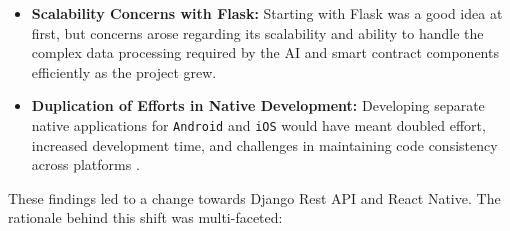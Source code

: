 \begin{itemize}
    \item \textbf{Scalability Concerns with Flask:} Starting with Flask was a good idea at first, but  concerns arose regarding its scalability and ability to handle the complex data processing \cite{Ghimire2020, CopperwaiteEtAl2015} required by the AI and smart contract components efficiently as the project grew.
    \item \textbf{Duplication of Efforts in Native Development:} Developing separate native applications for \texttt{Android} and \texttt{iOS} would have meant doubled effort, increased development time, and challenges in maintaining code consistency across platforms \cite{MasielloEtAl2017}.
\end{itemize}

These findings led to a change towards Django Rest API and React Native. The rationale behind this shift was multi-faceted:

